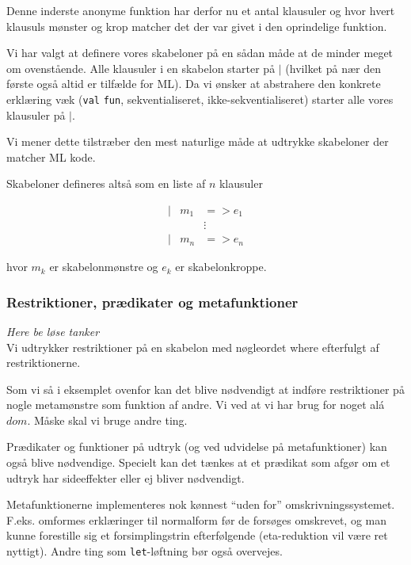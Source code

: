 Denne inderste anonyme funktion har derfor nu et antal klausuler og hvor hvert
klausuls mønster og krop matcher det der var givet i den oprindelige
funktion.

Vi har valgt at definere vores skabeloner på en sådan måde at de minder meget om
ovenstående. Alle klausuler i en skabelon starter på $|$ (hvilket på nær den
første også altid er tilfælde for ML). Da vi ønsker at abstrahere den konkrete
erklæring væk (\texttt{val} \texttt{fun}, sekventialiseret,
ikke-sekventialiseret) starter alle vores klausuler på $|$.

Vi mener dette tilstræber den mest naturlige måde at udtrykke skabeloner der
matcher ML kode.

Skabeloner defineres altså som en liste af $n$ klausuler

\begin{eqnarray*}[rqrl]
| & m_1 & => e_1 \\
  &  & \vdots \\
| & m_n & => e_n
\end{eqnarray*}

hvor $m_k$ er skabelonmønstre og $e_k$ er skabelonkroppe.


\subsubsection{Restriktioner, prædikater og metafunktioner}
\textit{Here be løse tanker}\\

Vi udtrykker restriktioner på en skabelon med nøgleordet \textsf{where}
efterfulgt af restriktionerne.

Som vi så i eksemplet ovenfor kan det blive nødvendigt at indføre restriktioner
på nogle metamønstre som funktion af andre. Vi ved at vi har brug for noget alá
$dom$. Måske skal vi bruge andre ting.

Prædikater og funktioner på udtryk (og ved udvidelse på metafunktioner) kan også
blive nødvendige. Specielt kan det tænkes at et prædikat som afgør om et udtryk
har sideeffekter eller ej bliver nødvendigt.

Metafunktionerne implementeres nok kønnest ``uden for''
omskrivningssystemet. F.eks. omformes erklæringer til normalform før de
forsøges omskrevet, og man kunne forestille sig et forsimplingstrin
efterfølgende (eta-reduktion vil være ret nyttigt). Andre ting som
\texttt{let}-løftning bør også overvejes.

